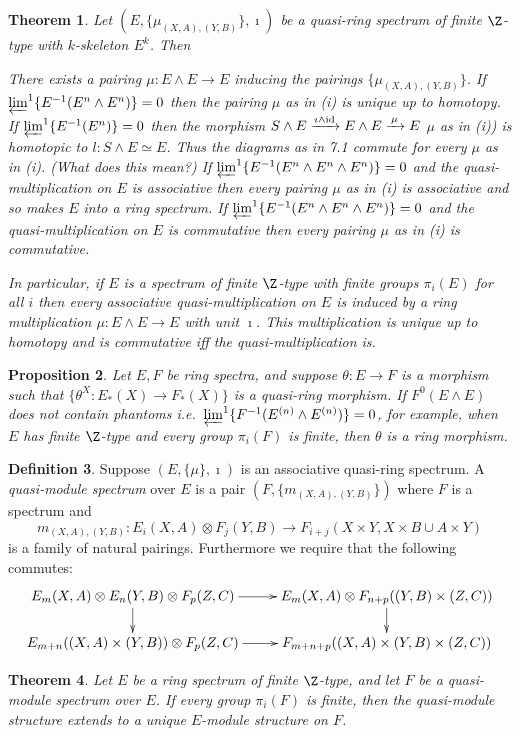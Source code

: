 \documentclass[11pt]{article}
\theoremstyle{plain}
\newtheorem{thm}{Theorem}[subsection]
\newtheorem{prop}[thm]{Proposition}
\theoremstyle{definition}
\newtheorem{defn}[thm]{Definition}
\begin{document}
\begin{thm}
Let $(E,\{\mu_{(X,A),(Y,B)}\},\imath)$ be a quasi-ring spectrum of finite
$\Z$-type with $k$-skeleton $E^k$. Then\upcol
\begin{itemise}
\itm[(i)]There exists a pairing $\mu:E\wedge E\to E$ inducing the pairings
$\{\mu_{(X,A),(Y,B)}\}$.
\itm[(ii)]If $\varprojlim^1\{E^{-1}(E^n\wedge E^n)\}=0$ then the pairing $\mu$
as in \textup{(i)} is unique up to homotopy.
\itm[(iii)]If $\varprojlim^1\{E^{-1}(E^n)\}=0$ then the morphism $S\wedge
E\xrightarrow{\imath\wedge \textup{id}}E\wedge E\xrightarrow{\,\mu\,}E$ \lparen$\mu$ as
in \textup{(i))} is homotopic to $l:S\wedge E\simeq E$. Thus the diagrams as in
7.1 commute for every $\mu$ as in \textup{(i)}. \textup{(What does this mean?)}
\itm[(iv)] If $\varprojlim^1\{E^{-1}(E^n\wedge E^n\wedge E^n)\}=0$ and the
quasi-multiplication on $E$ is associative then every pairing $\mu$ as in
\textup{(i)} is associative \lparen and so makes $E$ into a ring
spectrum\rparen.
\itm[(v)] If $\varprojlim^1\{E^{-1}(E^n\wedge E^n\wedge E^n)\}=0$ and the
quasi-multiplication on $E$ is commutative then every pairing $\mu$ as in
\textup{(i)} is commutative.
\end{itemise}
In particular, if $E$ is a spectrum of finite $\Z$-type with finite groups
$\pi_i(E)$ for all $i$ then every associative quasi-multiplication on $E$ is
induced by a ring multiplication $\mu:E\wedge E\to E$ \lparen with unit
$\imath$\rparen. This multiplication is unique up to homotopy and is commutative
iff the quasi-multiplication is.
\end{thm}
\begin{prop}
Let $E,F$ be ring spectra, and suppose $\theta:E\to F$ is a morphism such that
$\{\theta^X:E_*(X)\to F_*(X)\}$ is a quasi-ring morphism. If $F^0(E\wedge E)$
does not contain phantoms \lparen\textup{i.e.\
}$\varprojlim^1\{F^{-1}(E^{(n)}\wedge E^{(n)})\}=0$, for example, when $E$ has
finite $\Z$-type and every group $\pi_i(F)$ is finite\rparen, then $\theta$ is a
ring morphism.
\end{prop}
\begin{defn}
Suppose $(E,\{\mu\},\imath)$ is an associative quasi-ring spectrum. A
\emph{quasi-module spectrum} over $E$ is a pair $(F,\{m_{(X,A),(Y,B)}\})$ where
$F$ is a spectrum and
\[m_{(X,A),(Y,B)}:E_i(X,A)\otimes F_j(Y,B)\to F_{i+j}(X\times Y,X\times B\cup
A\times Y)\]
is a family of natural pairings. Furthermore we require that the following
commutes:
\[\xymatrix@R=.6cm{
E_m(X,A)\otimes E_n(Y,B)\otimes F_p(Z,C)\ar[r]\ar[d]&
E_m(X,A)\otimes F_{n+p}((Y,B)\times(Z,C))\ar[d]\\
E_{m+n}((X,A)\times(Y,B))\otimes F_p(Z,C)\ar[r]&
F_{m+n+p}((X,A)\times(Y,B)\times(Z,C))
}\]
\end{defn}
\begin{thm}
Let $E$ be a ring spectrum of finite $\Z$-type, and let $F$ be a quasi-module
spectrum over $E$. If every group $\pi_i(F)$ is finite, then the quasi-module
structure extends to a unique $E$-module structure on $F$.
\end{thm}
\end{document}
